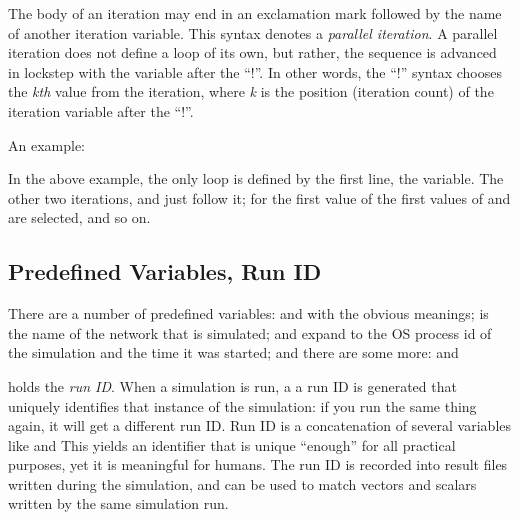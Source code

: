The body of an iteration may end in an exclamation mark followed by the
name of another iteration variable. This syntax denotes a \textit{parallel
iteration}. A parallel iteration does not define a loop of its own, but
rather, the sequence is advanced in lockstep with the variable after the
``!''. In other words, the ``!'' syntax chooses the \textit{kth} value from
the iteration, where \textit{k} is the position (iteration count) of the
iteration variable after the ``!''.

An example:


In the above example, the only loop is defined by the first line, the 
variable. The other two iterations,  and  just follow it;
for the first value of  the first values of  and 
are selected, and so on.



\subsection{Predefined Variables, Run ID}
\label{sec:config-sim:predefined-variables}

There are a number of predefined variables:  and
 with the obvious meanings;  is the
name of the network that is simulated;  and
 expand to the OS process id of the simulation and the
time it was started; and there are some more: 
 and 

 holds the \textit{run ID}. When a simulation is run, a a
run ID is generated that uniquely identifies that instance of the
simulation: if you run the same thing again, it will get a different run
ID. Run ID is a concatenation of several variables like
   and
 This yields an identifier that is unique ``enough''
for all practical purposes, yet it is meaningful for humans. The run ID is
recorded into result files written during the simulation, and can be used
to match vectors and scalars written by the same simulation run.



